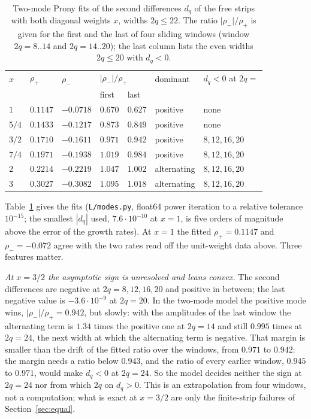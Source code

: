 \documentclass[11pt]{amsart}
\theoremstyle{definition}
\theoremstyle{remark}
\begin{document}
\begin{table}[ht]
\centering
\caption{Two-mode Prony fits of the second differences $d_q$ of the free strips with both diagonal
weights $x$, widths $2q \le 22$. The ratio $|\rho_-|/\rho_+$ is given for the first and the last of
four sliding windows (window $2q = 8..14$ and $2q = 14..20$); the last column lists the even widths
$2q \le 20$ with $d_q < 0$.}\label{tab:modes}
\begin{tabular}{lllllll}
\toprule
$x$ & $\rho_+$ & $\rho_-$ & \multicolumn{2}{l}{$|\rho_-|/\rho_+$} & dominant & $d_q < 0$ at $2q =$\\
 & & & first & last & & \\
\midrule
$1$     & $0.1147$ & $-0.0718$ & $0.670$ & $0.627$ & positive & none\\
$5/4$   & $0.1433$ & $-0.1217$ & $0.873$ & $0.849$ & positive & none\\
$3/2$   & $0.1710$ & $-0.1611$ & $0.971$ & $0.942$ & positive & $8, 12, 16, 20$\\
$7/4$   & $0.1971$ & $-0.1938$ & $1.019$ & $0.984$ & positive & $8, 12, 16, 20$\\
$2$     & $0.2214$ & $-0.2219$ & $1.047$ & $1.002$ & alternating & $8, 12, 16, 20$\\
$3$     & $0.3027$ & $-0.3082$ & $1.095$ & $1.018$ & alternating & $8, 12, 16, 20$\\
\bottomrule
\end{tabular}
\end{table}

Table~\ref{tab:modes} gives the fits (\texttt{L/modes.py}, float64 power iteration to a relative
tolerance $10^{-15}$; the smallest $|d_q|$ used, $7.6\cdot10^{-10}$ at $x = 1$, is five orders of
magnitude above the error of the growth rates). At $x = 1$ the fitted $\rho_+ = 0.1147$ and
$\rho_- = -0.072$ agree with the two rates read off the unit-weight data above. Three features
matter.

\emph{At $x = 3/2$ the asymptotic sign is unresolved and leans convex.} The second differences are
negative at $2q = 8, 12, 16, 20$ and positive in between; the last negative value is
$-3.6\cdot10^{-9}$ at $2q = 20$. In the two-mode model the positive mode wins, $|\rho_-|/\rho_+ =
0.942$, but slowly: with the amplitudes of the last window the alternating term is $1.34$ times the
positive one at $2q = 14$ and still $0.995$ times at $2q = 24$, the next width at which the
alternating term is negative. That margin is smaller than the drift of the fitted ratio over the
windows, from $0.971$ to $0.942$: the margin needs a ratio below $0.943$, and the ratio of every
earlier window, $0.945$ to $0.971$, would make $d_q < 0$ at $2q = 24$. So the model decides neither
the sign at $2q = 24$ nor from which $2q$ on $d_q > 0$.
This is an extrapolation from four
windows, not a computation; what is exact at $x = 3/2$ are only the finite-strip failures of
Section~\ref{sec:equal}.
\end{document}
